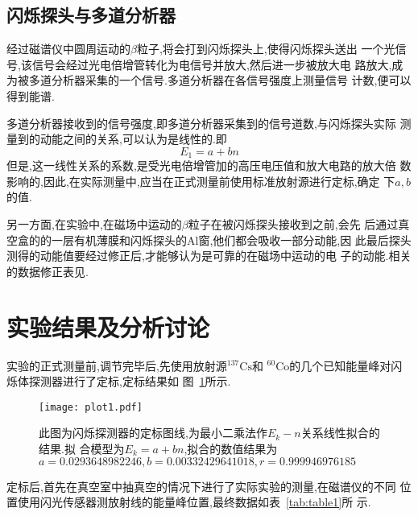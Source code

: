 \documentclass[aps,pre,12pt,preprint,onecolumn,showpacs,showkeys]{revtex4-1}
\begin{document}
\subsection{闪烁探头与多道分析器}

经过磁谱仪中圆周运动的$\beta$粒子,将会打到闪烁探头上,使得闪烁探头送出
一个光信号,该信号会经过光电倍增管转化为电信号并放大,然后进一步被放大电
路放大,成为被多道分析器采集的一个信号.多道分析器在各信号强度上测量信号
计数,便可以得到能谱.

多道分析器接收到的信号强度,即多道分析器采集到的信号道数,与闪烁探头实际
测量到的动能之间的关系,可以认为是线性的.即
\begin{equation}
  \label{eq:E-n}
  E_1 = a + bn
\end{equation}
但是,这一线性关系的系数,是受光电倍增管加的高压电压值和放大电路的放大倍
数影响的,因此,在实际测量中,应当在正式测量前使用标准放射源进行定标,确定
下$a,b$的值.

另一方面,在实验中,在磁场中运动的$\beta$粒子在被闪烁探头接收到之前,会先
后通过真空盒的的一层有机薄膜和闪烁探头的Al窗,他们都会吸收一部分动能,因
此最后探头测得的动能值要经过修正后,才能够认为是可靠的在磁场中运动的电
子的动能.相关的数据修正表见\cite{Book}.

\section{实验结果及分析讨论}

实验的正式测量前,调节完毕后,先使用放射源$^{137}\text{Cs}$和
$^{60}\text{Co}$的几个已知能量峰对闪烁体探测器进行了定标,定标结果如
图~\ref{fig:plot1}所示.

\begin{figure}[htbp]
  \centering
\texttt{[image: plot1.pdf]}
\caption{\label{fig:plot1}%
此图为闪烁探测器的定标图线,为最小二乘法作$E_k - n$关系线性拟合的结果.拟%
合模型为$E_k = a + bn$,拟合的数值结果为$a = 0.0293648982246, b =%
0.00332429641018, r = 0.999946976185$}
\end{figure}


定标后,首先在真空室中抽真空的情况下进行了实际实验的测量,在磁谱仪的不同
位置使用闪光传感器测放射线的能量峰位置,最终数据如表~\ref{tab:table1}所
示.
\end{document}
